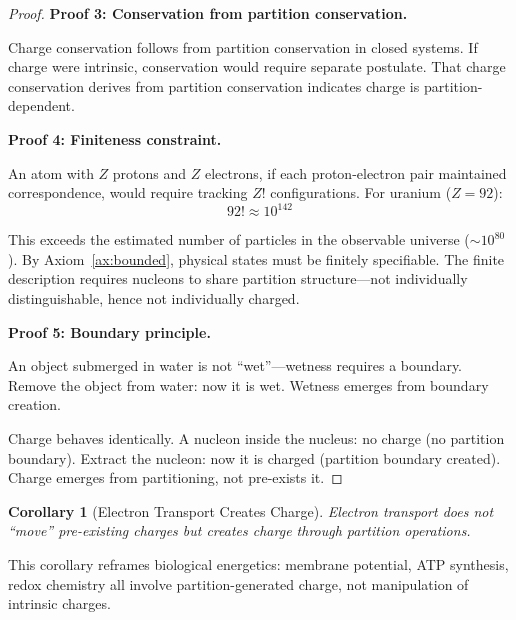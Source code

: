 \documentclass[twocolumn,10pt,a4paper]{article}
\newtheorem{corollary}[theorem]{Corollary}
\theoremstyle{definition}
\theoremstyle{remark}
\begin{document}
\begin{proof}
\textbf{Proof 3: Conservation from partition conservation.}

Charge conservation follows from partition conservation in closed systems. If charge were intrinsic, conservation would require separate postulate. That charge conservation derives from partition conservation indicates charge is partition-dependent.

\textbf{Proof 4: Finiteness constraint.}

An atom with $Z$ protons and $Z$ electrons, if each proton-electron pair maintained correspondence, would require tracking $Z!$ configurations. For uranium ($Z = 92$):
\begin{equation}
    92! \approx 10^{142}
\end{equation}

This exceeds the estimated number of particles in the observable universe ($\sim 10^{80}$). By Axiom~\ref{ax:bounded}, physical states must be finitely specifiable. The finite description requires nucleons to share partition structure---not individually distinguishable, hence not individually charged.

\textbf{Proof 5: Boundary principle.}

An object submerged in water is not ``wet''---wetness requires a boundary. Remove the object from water: now it is wet. Wetness emerges from boundary creation.

Charge behaves identically. A nucleon inside the nucleus: no charge (no partition boundary). Extract the nucleon: now it is charged (partition boundary created). Charge emerges from partitioning, not pre-exists it.
\end{proof}

\begin{corollary}[Electron Transport Creates Charge]
\label{cor:et_charge}
Electron transport does not ``move'' pre-existing charges but creates charge through partition operations.
\end{corollary}

This corollary reframes biological energetics: membrane potential, ATP synthesis, redox chemistry all involve partition-generated charge, not manipulation of intrinsic charges.
\end{document}
